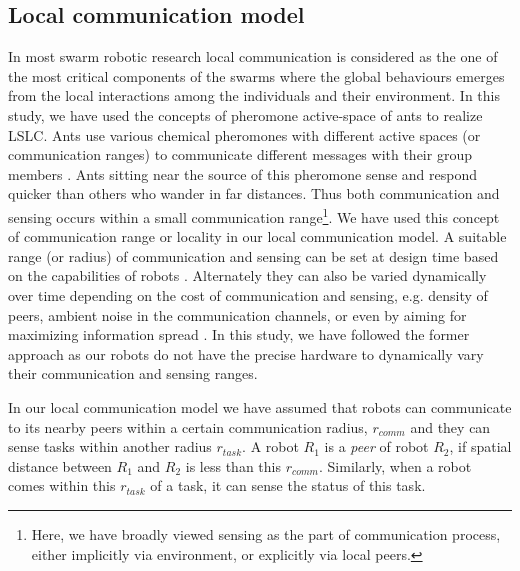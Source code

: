 \documentclass[journal]{IEEEtran}
\begin{document}
\subsection{Local communication model}
In most swarm robotic research local communication is considered as the one of the most critical components of the swarms where the global behaviours emerges from the local interactions among the individuals and their environment. In this study, we have used the concepts of pheromone active-space of ants to realize LSLC. Ants use various chemical pheromones with different active spaces (or communication ranges) to communicate different messages with their group members \cite{Holldobler1990}. Ants sitting near the source of this pheromone sense and respond quicker than others who wander in far distances. Thus both communication and sensing occurs within a small communication range\footnote{Here, we have broadly viewed sensing as the part of communication process, either implicitly via environment, or explicitly via local peers.}. 
We have used this concept of communication range or locality in our local communication model. A suitable  range (or radius) of communication and sensing can be set at design time based on the capabilities of robots \cite{Agassounon+2002}. Alternately they can also be varied dynamically over time depending on the  cost of communication and sensing, e.g. density of peers, ambient noise in the communication channels, or even by aiming for maximizing information spread  \cite{Yoshida+2000}. In this study, we have followed the former approach as our robots do not have the precise hardware to dynamically vary their communication and sensing ranges. 

In our local communication model we have assumed that robots can communicate to its nearby peers within a certain communication radius, $r_{comm}$ and they can sense tasks within another radius $r_{task}$. %
A robot $R_1$ is a {\em peer} of robot $R_2$, if spatial distance between $R_1$ and $R_2$ is less than this $r_{comm}$.
Similarly, when a robot comes within this $r_{task}$ of a task, it can sense the status of this task. 
\end{document}
